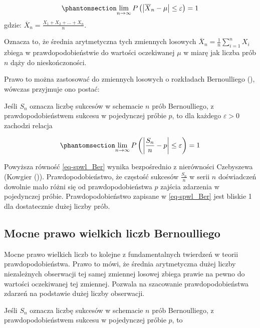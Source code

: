 \documentclass[
  letterpaper,
  DIV=11,
  numbers=noendperiod]{scrreprt}
\begin{document}
\begin{equation}\phantomsection\label{eq-pwl}{\lim_{n \to \infty} P\left( \left|\overline{X}_n-\mu\right| \le \varepsilon \right) =1}\end{equation}
gdzie: \(\overline{X}_n=\frac{X_1+X_2+\ldots +X_n}{n}\).

Oznacza to, że średnia arytmetyczna tych zmiennych losowych
\(\overline{X}_n = \frac{1}{n} \sum_{i=1}^{n} X_i\) zbiega w
prawdopodobieństwie do wartości oczekiwanej \(\mu\) w miarę jak liczba
prób \(n\) dąży do nieskończoności.

Prawo to można zastosować do zmiennych losowych o rozkładach
Bernoulliego (),
wówczas przyjmuje ono postać:

Jeśli \(S_n\) oznacza liczbę sukcesów w schemacie \(n\) prób
Bernoulliego, z prawdopodobieństwem sukcesu w pojedynczej próbie \(p\),
to dla każdego \(\varepsilon > 0\) zachodzi relacja

\begin{equation}\phantomsection\label{eq-spwl_Ber}{\lim_{n \to \infty} P\left( \left|\frac{S_n}{n}-p\right| \le \varepsilon \right) =1}\end{equation}

Powyższa równość \ref{eq-spwl_Ber} wynika bezpośrednio z nierówności
Czebyszewa (Kowgier ()).
Prawdopodobieństwo, że częstość sukcesów \(\frac{S_n}{n}\) w serii \(n\)
doświadczeń dowolnie mało różni się od prawdopodobieństwa \(p\) zajścia
zdarzenia w pojedynczej próbie. Prawdopodobieństwo zapisane w
\ref{eq-spwl_Ber} jest bliskie 1 dla dostatecznie dużej liczby prób.

\subsection{Mocne prawo wielkich liczb
Bernoulliego}\label{mocne-prawo-wielkich-liczb-bernoulliego}

Mocne prawo wielkich liczb to kolejne z fundamentalnych twierdzeń w
teorii prawdopodobieństwa. Prawo to mówi, że średnia arytmetyczna dużej
liczby niezależnych obserwacji tej samej zmiennej losowej zbiega prawie
na pewno do wartości oczekiwanej tej zmiennej. Pozwala na szacowanie
prawdopodobieństwa zdarzeń na podstawie dużej liczby obserwacji.

Jeśli \(S_n\) oznacza liczbę sukcesów w schemacie \(n\) prób
Bernoulliego, z prawdopodobieństwem sukcesu w pojedynczej próbie \(p\),
to
\end{document}

